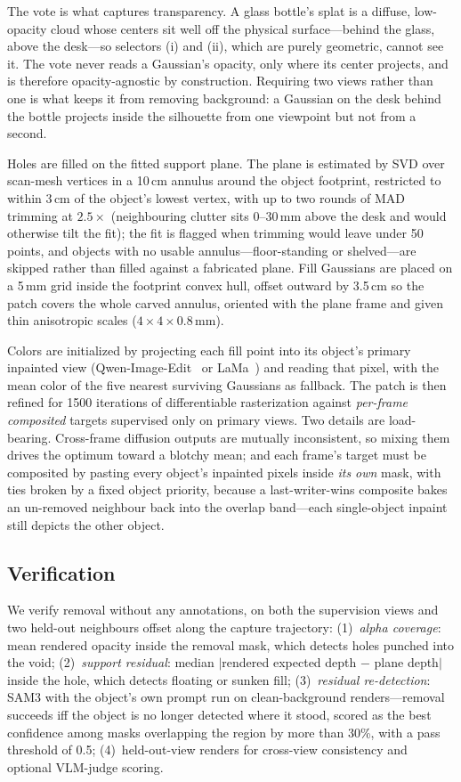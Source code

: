 The vote is what captures transparency. A glass bottle's splat is a
diffuse, low-opacity cloud whose centers sit well off the physical
surface---behind the glass, above the desk---so selectors (i) and (ii),
which are purely geometric, cannot see it. The vote never reads a
Gaussian's opacity, only where its center projects, and is therefore
opacity-agnostic by construction. Requiring two views rather than one is
what keeps it from removing background: a Gaussian on the desk behind the
bottle projects inside the silhouette from one viewpoint but not from a
second.

Holes are filled on the fitted support plane. The plane is estimated by
SVD over scan-mesh vertices in a 10\,cm annulus around the object
footprint, restricted to within 3\,cm of the object's lowest vertex, with
up to two rounds of MAD trimming at $2.5\times$ (neighbouring clutter
sits 0--30\,mm above the desk and would otherwise tilt the fit); the fit
is flagged when trimming would leave under 50 points, and objects with no
usable annulus---floor-standing or shelved---are skipped rather than
filled against a fabricated plane. Fill Gaussians are placed on a 5\,mm
grid inside the footprint convex hull, offset outward by 3.5\,cm so the
patch covers the whole carved annulus, oriented with the plane frame and
given thin anisotropic scales ($4{\times}4{\times}0.8$\,mm).

Colors are initialized by projecting each fill point into its object's
primary inpainted view (Qwen-Image-Edit~\cite{qwenimage} or
LaMa~\cite{lama}) and reading that pixel, with the mean color of the five
nearest surviving Gaussians as fallback. The patch is then refined for
1500 iterations of differentiable rasterization against \emph{per-frame
composited} targets supervised only on primary views. Two details are
load-bearing. Cross-frame diffusion outputs are mutually inconsistent, so
mixing them drives the optimum toward a blotchy mean; and each frame's
target must be composited by pasting every object's inpainted pixels
inside \emph{its own} mask, with ties broken by a fixed object priority,
because a last-writer-wins composite bakes an un-removed neighbour back
into the overlap band---each single-object inpaint still depicts the other
object.

\subsection{Verification}
\label{sec:verification}
We verify removal without any annotations, on both the supervision views
and two held-out neighbours offset along the capture trajectory:
(1)~\emph{alpha coverage}: mean rendered opacity inside the removal mask,
which detects holes punched into the void;
(2)~\emph{support residual}: median $|$rendered expected depth $-$ plane
depth$|$ inside the hole, which detects floating or sunken fill;
(3)~\emph{residual re-detection}: SAM3 with the object's own prompt run on
clean-background renders---removal succeeds iff the object is no longer
detected where it stood, scored as the best confidence among masks
overlapping the region by more than 30\%, with a pass threshold of 0.5;
(4)~held-out-view renders for cross-view consistency and optional
VLM-judge scoring.

